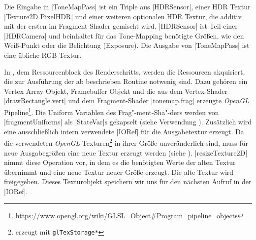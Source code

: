 Die Eingabe in |ToneMapPass| ist ein Triple aus |HDRSensor|, einer HDR Textur |Texture2D PixelHDR| und einer weiteren optionalen HDR Textur, die additiv mit der ersten im Fragment-Shader gemischt wird. |HDRSensor| ist Teil einer |HDRCamera| und beinhaltet für das Tone-Mapping benötigte Größen, wie den Weiß-Punkt oder die Belichtung (Exposure). Die Ausgabe von |ToneMapPass| ist eine übliche RGB Textur.


In , dem Ressourcenblock des Renderschritts, werden die Ressourcen akquiriert, die zur Ausführung der ab  beschrieben Routine notwenig sind. Dazu gehören ein Vertex Array Objekt, Framebuffer Objekt und die aus dem Vertex-Shader |drawRectangle.vert| und dem Fragment-Shader |tonemap.frag| erzeugte \textit{OpenGL} Pipeline\footnote{https://www.opengl.org/wiki/GLSL\_Object\#Program\_pipeline\_objects}. Die Uniform Variablen des Frag"-ment-Sha"-ders werden von |fragmentUniforms| als |StateVar|s gekapselt (siehe Verwendung ). Zusätzlich wird eine ausschließlich intern verwendete |IORef| für die Ausgabetextur erzeugt. Da die verwendeten \textit{OpenGL} Texturen\footnote{erzeugt mit \texttt{glTexStorage*}} in ihrer Größe unveränderlich sind, muss für neue Ausgabegrößen eine neue Textur erzeugt werden (siehe ). |resizeTexture2D| nimmt diese Operation vor, in dem es die benötigten Werte der alten Textur übernimmt und eine neue Textur neuer Größe erzeugt. Die alte Textur wird freigegeben. Dieses Texturobjekt speichern wir uns für den nächsten Aufruf in der |IORef|.

